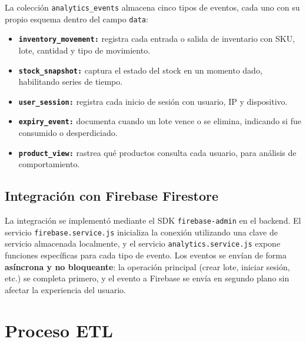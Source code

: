 \documentclass[journal]{IEEEtran}
\begin{document}
	La colecci\'{o}n \texttt{analytics\_events} almacena cinco tipos
	de eventos, cada uno con su propio esquema dentro del campo
	\texttt{data}:
	
	\begin{itemize}[leftmargin=*, label=\textbullet, itemsep=2pt]
		\item \textbf{\texttt{inventory\_movement:}} registra cada
		entrada o salida de inventario con SKU, lote, cantidad y
		tipo de movimiento.
		
		\item \textbf{\texttt{stock\_snapshot:}} captura el estado
		del stock en un momento dado, habilitando series de
		tiempo.
		
		\item \textbf{\texttt{user\_session:}} registra cada inicio
		de sesi\'{o}n con usuario, IP y dispositivo.
		
		\item \textbf{\texttt{expiry\_event:}} documenta cuando un
		lote vence o se elimina, indicando si fue consumido o
		desperdiciado.
		
		\item \textbf{\texttt{product\_view:}} rastrea qu\'{e}
		productos consulta cada usuario, para an\'{a}lisis de
		comportamiento.
	\end{itemize}
	
	\subsection{Integraci\'{o}n con Firebase Firestore}
	\label{subsec:firestore}
	
	La integraci\'{o}n se implement\'{o} mediante el SDK
	\texttt{firebase-admin} en el backend. El servicio
	\texttt{firebase.service.js} inicializa la conexi\'{o}n
	utilizando una clave de servicio almacenada localmente, y el
	servicio \texttt{analytics.service.js} expone funciones
	espec\'{i}ficas para cada tipo de evento. Los eventos se
	env\'{i}an de forma \textbf{as\'{i}ncrona y no bloqueante}:
	la operaci\'{o}n principal (crear lote, iniciar sesi\'{o}n,
	etc.) se completa primero, y el evento a Firebase se env\'{i}a
	en segundo plano sin afectar la experiencia del usuario.
	


	\section{Proceso ETL}
	\label{sec:etl}
	
\end{document}
